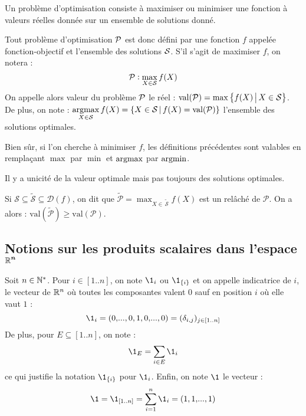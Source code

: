 	\begin{Rappel}
	 Un problème d'optimisation consiste à maximiser ou minimiser une fonction à valeurs réelles donnée sur un ensemble de solutions donné.
	\end{Rappel}
	
	\eqskip{3mm}
	\begin{Definition}
		Tout problème d'optimisation \(\cal{P}\) est donc défini par une fonction \(f\) appelée fonction-objectif et l'ensemble des solutions \(\cal{S}\). S'il s'agit de maximiser \(f\), on notera :
			\[
				\cal{P} : \max_{X\in\cal{S}} f(X)
			\]
		On appelle alors valeur du problème \(\cal{P}\) le réel : \(\val(\cal{P}) = \max \left\{f(X)\,\middle|\,X\in \cal{S}\right\}\). \\
		De plus, on note : \(\displaystyle \argmax_{X\in\cal{S}} f(X) = \{X\in \cal{S}\,|\,f(X) = \val(\cal{P})\}\) l'ensemble des solutions optimales.
	\end{Definition}
	
	\begin{Remarque}
		Bien sûr, si l'on cherche à minimiser \(f\), les définitions précédentes sont valables en remplaçant \(\max\) par \(\min\) et \(\argmax\) par \(\argmin\).
	\end{Remarque}
	
	\begin{Remarque}
		Il y a unicité de la valeur optimale mais pas toujours des solutions optimales.
	\end{Remarque}
	
	\begin{Definition}[relaĉhés]
		Si \( \mathcal{S} \subseteq \widetilde{\mathcal{S}} \subseteq \mathcal{D} (f)\), on dit que \( \widetilde{\mathcal{P}} = \displaystyle \max_{X \in \, \widetilde{\mathcal{S}}} f(X) \) est un relâché de $\mathcal{P}$. On a alors : \( \mathrm{val} (\widetilde{\mathcal{P}}) \geq \mathrm{val} ({\mathcal{P}}) \).
	\end{Definition}

	\subsection{Notions sur les produits scalaires dans l'espace \(\bm{\bb{R}^n}\)}
		
		\eqskip{2mm}
		\begin{Definition}[indicatrices]
			Soit \(n\in\bb{N}^*\). Pour \(i\in[1..n]\), on note \(\1_i\) ou \(\1_{\{i\}}\) et on appelle indicatrice de \(i\), le vecteur de \(\bb{R}^n\) où toutes les composantes valent \(0\) sauf en position \(i\) où elle vaut \(1\) :
				\[
					\1_i = (0,\!...,0,1,0,\!...,0) = (\delta_{i,j})_{j\in[1..n]}
				\]
			De plus, pour \(E \subseteq [1..n]\), on note :
			\[
				\1_E = \sum_{i\in E} \1_i
			\]
			ce qui justifie la notation \(\1_{\{i\}}\) pour \(\1_i\). Enfin, on note \(\1\) le vecteur :
				\[
					\1 = \1_{[1..n]} = \sum_{i=1}^n \1_i = (1,1,\!...,1)
				\]
			
		\end{Definition}
		
